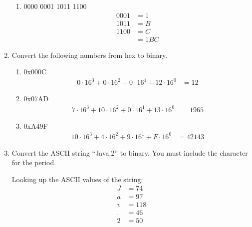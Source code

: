\documentclass[12pt]{article}
\begin{document}
\begin{enumerate}
\begin{enumerate}
      \item 0000 0001 1011 1100
      \begin{align*}
        0001 &= 1 \\
        1011 &= B \\
        1100 &= C \\
        &= 1BC
      \end{align*}
    \end{enumerate}

    \item Convert the following numbers from hex to binary.
    \begin{enumerate}
      \item 0x000C
      \begin{align*}
        0 \cdot 16^3 + 0 \cdot 16^2 + 0 \cdot 16^1 + 12 \cdot 16^0 &= 12
      \end{align*}

      \item 0x07AD
      \begin{align*}
        7 \cdot 16^3 + 10 \cdot 16^2 + 0 \cdot 16^1 + 13 \cdot 16^0 &= 1965
      \end{align*}

      \item 0xA49F
      \begin{align*}
        10 \cdot 16^3 + 4 \cdot 16^2 + 9 \cdot 16^1 + F \cdot 16^0 &= 42143
      \end{align*}
    \end{enumerate}

    \item Convert the ASCII string “Java.2” to binary. You must include the character for the period.

    Looking up the ASCII values of the string:
    \begin{align*}
      J &= 74 \\
      a &= 97 \\
      v &= 118 \\
      . &= 46 \\
      2 &= 50
    \end{align*}


\end{enumerate}
\end{document}
